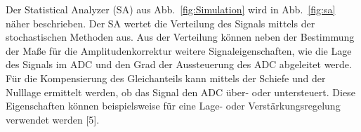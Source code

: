 
Der Statistical Analyzer (SA) aus Abb.~\ref{fig:Simulation} wird in Abb.~\ref{fig:sa} näher beschrieben. Der SA wertet die Verteilung des Signals mittels der stochastischen Methoden aus. Aus der Verteilung können neben der Bestimmung der Maße für die Amplitudenkorrektur weitere Signaleigenschaften, wie die Lage des Signals im ADC und den Grad der Aussteuerung des ADC abgeleitet werde. Für die Kompensierung des Gleichanteils kann mittels der Schiefe und der Nulllage ermittelt werden, ob das Signal den ADC über- oder  untersteuert. Diese Eigenschaften können beispielsweise für eine Lage- oder Verstärkungsregelung verwendet werden [5].


